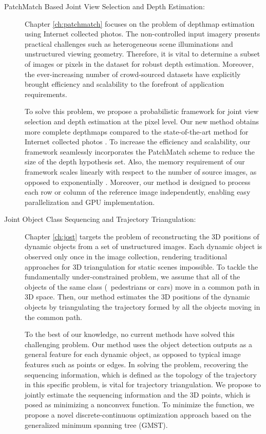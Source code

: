 \begin{description}

\item[PatchMatch Based Joint View Selection and Depth Estimation:]
Chapter \ref{ch:patchmatch} focuses on the problem of depthmap estimation using Internet collected photos. The non-controlled input imagery presents practical challenges such as heterogeneous scene illuminations and unstructured viewing geometry. Therefore, it is vital to determine a subset of images or pixels in the dataset for robust depth estimation. Moreover, the ever-increasing number of crowd-sourced datasets have explicitly brought efficiency and scalability to the forefront of application requirements.

To solve this problem, we propose a probabilistic framework for joint view selection and depth estimation at the pixel level. Our new method obtains more complete depthmaps compared to the state-of-the-art method for Internet collected photos \cite{Goesele07}. To increase the efficiency and scalability, our framework seamlessly incorporates the PatchMatch scheme \cite{patchMatchStereo1} to  reduce the size of the depth hypothesis set. Also, the memory requirement of our framework scales linearly with respect to the number of source images, as opposed to exponentially \cite{CombinedDepthOutlier}. Moreover, our method is designed to process each row or column of the reference image independently, enabling easy parallelization and GPU implementation.

\item[Joint Object Class Sequencing and Trajectory Triangulation:]
Chapter \ref{ch:jost} targets the problem of reconstructing the 3D positions of dynamic objects from a set of unstructured images. Each dynamic object is observed only once in the image collection, rendering traditional approaches for 3D triangulation for static scenes impossible. To tackle the fundamentally under-constrained problem, we assume that all of the objects of the same class (\eg~pedestrians or cars) move in a common path in 3D space. Then, our method estimates the 3D positions of the dynamic objects by triangulating the trajectory formed by all the objects moving in the common path. 

To the best of our knowledge, no current methods have solved this challenging problem. 
Our method uses the object detection outputs as a general feature for each dynamic object, as opposed to typical image features such as points or edges. In solving the problem, recovering the sequencing information, which is defined as the topology of the trajectory in this specific problem, is vital for trajectory triangulation. We propose to jointly estimate the sequencing information and the 3D points, which is posed as minimizing a nonconvex function. To minimize the function, we propose a novel discrete-continuous optimization approach based on the generalized minimum spanning tree (GMST). 


\end{description}
